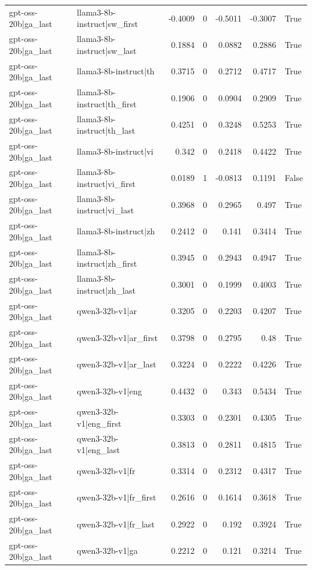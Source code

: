 \begin{table}
\begin{tabular}{l l r r r r l}
gpt-oss-20b|ga_last & llama3-8b-instruct|sw_first & -0.4009 & 0 & -0.5011 & -0.3007 & True \\
gpt-oss-20b|ga_last & llama3-8b-instruct|sw_last & 0.1884 & 0 & 0.0882 & 0.2886 & True \\
gpt-oss-20b|ga_last & llama3-8b-instruct|th & 0.3715 & 0 & 0.2712 & 0.4717 & True \\
gpt-oss-20b|ga_last & llama3-8b-instruct|th_first & 0.1906 & 0 & 0.0904 & 0.2909 & True \\
gpt-oss-20b|ga_last & llama3-8b-instruct|th_last & 0.4251 & 0 & 0.3248 & 0.5253 & True \\
gpt-oss-20b|ga_last & llama3-8b-instruct|vi & 0.342 & 0 & 0.2418 & 0.4422 & True \\
gpt-oss-20b|ga_last & llama3-8b-instruct|vi_first & 0.0189 & 1 & -0.0813 & 0.1191 & False \\
gpt-oss-20b|ga_last & llama3-8b-instruct|vi_last & 0.3968 & 0 & 0.2965 & 0.497 & True \\
gpt-oss-20b|ga_last & llama3-8b-instruct|zh & 0.2412 & 0 & 0.141 & 0.3414 & True \\
gpt-oss-20b|ga_last & llama3-8b-instruct|zh_first & 0.3945 & 0 & 0.2943 & 0.4947 & True \\
gpt-oss-20b|ga_last & llama3-8b-instruct|zh_last & 0.3001 & 0 & 0.1999 & 0.4003 & True \\
gpt-oss-20b|ga_last & qwen3-32b-v1|ar & 0.3205 & 0 & 0.2203 & 0.4207 & True \\
gpt-oss-20b|ga_last & qwen3-32b-v1|ar_first & 0.3798 & 0 & 0.2795 & 0.48 & True \\
gpt-oss-20b|ga_last & qwen3-32b-v1|ar_last & 0.3224 & 0 & 0.2222 & 0.4226 & True \\
gpt-oss-20b|ga_last & qwen3-32b-v1|eng & 0.4432 & 0 & 0.343 & 0.5434 & True \\
gpt-oss-20b|ga_last & qwen3-32b-v1|eng_first & 0.3303 & 0 & 0.2301 & 0.4305 & True \\
gpt-oss-20b|ga_last & qwen3-32b-v1|eng_last & 0.3813 & 0 & 0.2811 & 0.4815 & True \\
gpt-oss-20b|ga_last & qwen3-32b-v1|fr & 0.3314 & 0 & 0.2312 & 0.4317 & True \\
gpt-oss-20b|ga_last & qwen3-32b-v1|fr_first & 0.2616 & 0 & 0.1614 & 0.3618 & True \\
gpt-oss-20b|ga_last & qwen3-32b-v1|fr_last & 0.2922 & 0 & 0.192 & 0.3924 & True \\
gpt-oss-20b|ga_last & qwen3-32b-v1|ga & 0.2212 & 0 & 0.121 & 0.3214 & True \\

\end{tabular}
\end{table}
